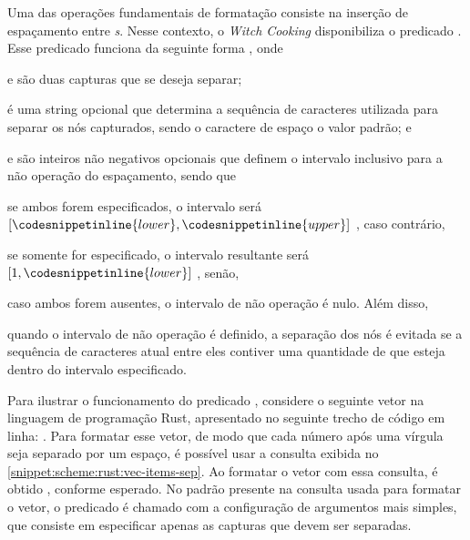 \documentclass
  [11pt,a4paper,english,brazil,openright,sumario=tradicional,twoside]
  {abntex2}
\newcommand{\witchcooking}{\textit{Witch Cooking}\xspace}
\begin{document}
{{  Uma das operações fundamentais de formatação consiste na inserção de
  espaçamento entre \textit{s}. Nesse contexto, o \witchcooking
  disponibiliza o predicado . Esse predicado funciona
  da seguinte forma ,
  onde
  \begin{inparaenum}
    \item {} e  são duas capturas que
          se deseja separar;
    \item {} é uma string opcional que determina a
          sequência de caracteres utilizada para separar os nós capturados,
          sendo o caractere de espaço o valor padrão; e
    \item {} e  são inteiros
          não negativos opcionais que definem o intervalo inclusivo para a
          não operação do espaçamento, sendo que
          \begin{inparaenum}
            \item se ambos forem especificados, o intervalo será
                  $ \left
                      [ \codesnippetinline{lower},
                        \codesnippetinline{upper}\right]$%
                  , caso contrário,
            \item se somente  for especificado, o
                  intervalo resultante será
                  $\left[1, \codesnippetinline{lower}\right]$%
                  , senão,
            \item caso ambos forem ausentes, o intervalo de não operação é
                  nulo. Além disso,
            \item quando o intervalo de não operação é definido, a separação
                  dos nós é evitada se a sequência de caracteres atual entre
                  eles contiver uma quantidade de  que
                  esteja dentro do intervalo especificado.
          \end{inparaenum}
  \end{inparaenum}

  Para ilustrar o funcionamento do predicado ,
  considere o seguinte vetor na linguagem de programação Rust, apresentado no
  seguinte trecho de código em linha: \codesnippetinline[rust]{[0,1,   2,  3]}.
  Para formatar esse vetor, de modo que cada número após uma vírgula seja
  separado por um espaço, é possível usar a consulta exibida no
  \cref{snippet:scheme:rust:vec-items-sep}. Ao formatar o vetor com essa
  consulta, é obtido \codesnippetinline[rust]{[0, 1, 2, 3]}, conforme esperado.
  No padrão presente na consulta usada para formatar o vetor, o predicado
   é chamado com a configuração de argumentos mais
  simples, que consiste em especificar apenas as capturas que devem ser
  separadas.

}}
\end{document}
